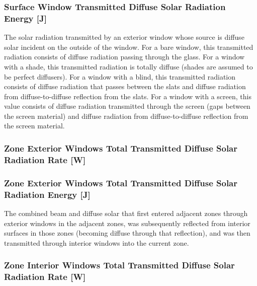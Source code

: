 \subsubsection{Surface Window Transmitted Diffuse Solar Radiation Energy {[}J{]}}\label{surface-window-transmitted-diffuse-solar-radiation-energy-j}

The solar radiation transmitted by an exterior window whose source is diffuse solar incident on the outside of the window. For a bare window, this transmitted radiation consists of diffuse radiation passing through the glass. For a window with a shade, this transmitted radiation is totally diffuse (shades are assumed to be perfect diffusers). For a window with a blind, this transmitted radiation consists of diffuse radiation that passes between the slats and diffuse radiation from diffuse-to-diffuse reflection from the slats. For a window with a screen, this value consists of diffuse radiation transmitted through the screen (gaps between the screen material) and diffuse radiation from diffuse-to-diffuse reflection from the screen material.

\subsubsection{Zone Exterior Windows Total Transmitted Diffuse Solar Radiation Rate {[}W{]}}\label{zone-exterior-windows-total-transmitted-diffuse-solar-radiation-rate-w}

\subsubsection{Zone Exterior Windows Total Transmitted Diffuse Solar Radiation Energy {[}J{]}}\label{zone-exterior-windows-total-transmitted-diffuse-solar-radiation-energy-j}

The combined beam and diffuse solar that first entered adjacent zones through exterior windows in the adjacent zones, was subsequently reflected from interior surfaces in those zones (becoming diffuse through that reflection), and was then transmitted through interior windows into the current zone.

\subsubsection{Zone Interior Windows Total Transmitted Diffuse Solar Radiation Rate {[}W{]}}\label{zone-interior-windows-total-transmitted-diffuse-solar-radiation-rate-w}

